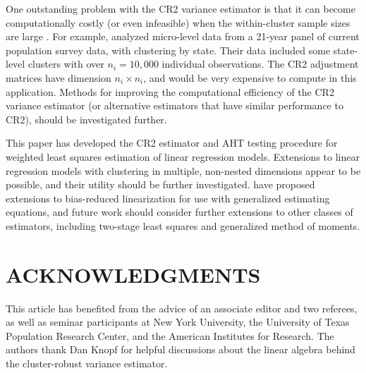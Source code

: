 \documentclass[12pt]{article}\usepackage[]{graphicx}\usepackage[]{color}
\begin{document}
One outstanding problem with the CR2 variance estimator is that it can become computationally costly (or even infeasible) when the within-cluster sample sizes are large \citep{Mackinnon2015wildCIs}. 
For example, \citet{Bertrand2004how} analyzed micro-level data from a 21-year panel of current population survey data, with clustering by state. Their data included some state-level clusters with over $n_i = 10,000$ individual observations. 
The CR2 adjustment matrices have dimension $n_i \times n_i$, and would be very expensive to compute in this application. 
Methods for improving the computational efficiency of the CR2 variance estimator (or alternative estimators that have similar performance to CR2), should be investigated further. 

This paper has developed the CR2 estimator and AHT testing procedure for weighted least squares estimation of linear regression models. 
Extensions to linear regression models with clustering in multiple, non-nested dimensions \citep[cf.][]{Cameron2011robust} appear to be possible, and their utility should be further investigated. 
\citet{McCaffrey2006improved} have proposed extensions to bias-reduced linearization for use with generalized estimating equations, and future work should consider further extensions to other classes of estimators, including two-stage least squares and generalized method of moments. 

\section*{ACKNOWLEDGMENTS}

This article has benefited from the advice of an associate editor and two referees, as well as seminar participants at New York University, the University of Texas Population Research Center, and the American Institutes for Research. The authors thank Dan Knopf for helpful discussions about the linear algebra behind the cluster-robust variance estimator.


\end{document}
